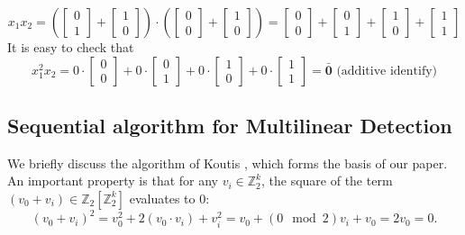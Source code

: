 \begin{mdframed}
{\[
x_1x_2 = 
\left(
\begin{bmatrix}
0\\
1
\end{bmatrix}
+ 
\begin{bmatrix}
1\\
0
\end{bmatrix}
\right)\cdot 
\left(
\begin{bmatrix}
0\\
0
\end{bmatrix}
+
\begin{bmatrix}
1\\
0
\end{bmatrix}
\right) =
\begin{bmatrix}
0\\
0
\end{bmatrix}
+
\begin{bmatrix}
0\\
1
\end{bmatrix}
+
\begin{bmatrix}
1\\
0
\end{bmatrix}
+
\begin{bmatrix}
1\\
1
\end{bmatrix}
\]
It is easy to check that
\[
x_1^2x_2 = 
0\cdot
\begin{bmatrix}
0\\
0
\end{bmatrix}
+ 0\cdot
\begin{bmatrix}
0\\
1
\end{bmatrix}
+ 0\cdot
\begin{bmatrix}
1\\
0
\end{bmatrix}
+ 0\cdot
\begin{bmatrix}
1\\
1
\end{bmatrix}
= \mathbf{\bar{0}} \text{ (additive identify)}
\]
}
\end{mdframed}

\subsection{Sequential algorithm for Multilinear Detection} 
\label{sec:seq}
We briefly discuss the algorithm of Koutis \cite{koutis:icalp08}, which forms the basis of our paper. An important property is that for any $v_i \in \mathbb{Z}_2^k$, the square of the term $(v_0 + v_i) \in \mathbb{Z}_2[\mathbb{Z}_2^k]$ evaluates to 0:
{\small
$$
(v_0 + v_i)^2 = v_0^2 + 2(v_0\cdot v_i) + v_i^2 = v_0 + (0\mod 2)v_i + v_0 = 2v_0 = 0.
$$}


